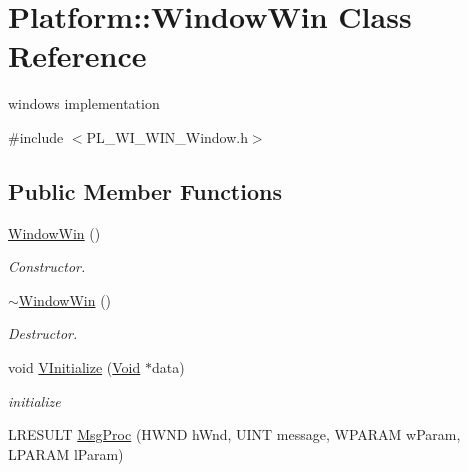 \hypertarget{classPlatform_1_1WindowWin}{
\section{Platform::WindowWin Class Reference}
\label{classPlatform_1_1WindowWin}
}


windows implementation  


{\ttfamily \#include $<$PL\_\-WI\_\-WIN\_\-Window.h$>$}\subsection*{Public Member Functions}
\begin{DoxyCompactItemize}
\item 
\hypertarget{classPlatform_1_1WindowWin_a122958b5cfab59680fcca9b3aacc7f2a}{
\hyperlink{classPlatform_1_1WindowWin_a122958b5cfab59680fcca9b3aacc7f2a}{WindowWin} ()}
\label{classPlatform_1_1WindowWin_a122958b5cfab59680fcca9b3aacc7f2a}

\begin{DoxyCompactList}\small\item\em Constructor. \item\end{DoxyCompactList}\item 
\hypertarget{classPlatform_1_1WindowWin_ac07418285a3a94799509f829b72cc908}{
\hyperlink{classPlatform_1_1WindowWin_ac07418285a3a94799509f829b72cc908}{$\sim$WindowWin} ()}
\label{classPlatform_1_1WindowWin_ac07418285a3a94799509f829b72cc908}

\begin{DoxyCompactList}\small\item\em Destructor. \item\end{DoxyCompactList}\item 
\hypertarget{classPlatform_1_1WindowWin_a1035c00dd6b01cc4cd6f3c0cf3676d44}{
void \hyperlink{classPlatform_1_1WindowWin_a1035c00dd6b01cc4cd6f3c0cf3676d44}{VInitialize} (\hyperlink{structVoid}{Void} $\ast$data)}
\label{classPlatform_1_1WindowWin_a1035c00dd6b01cc4cd6f3c0cf3676d44}

\begin{DoxyCompactList}\small\item\em initialize \item\end{DoxyCompactList}\item 
\hypertarget{classPlatform_1_1WindowWin_ac3d6eb069eceb91045032c90d797d6dd}{
LRESULT \hyperlink{classPlatform_1_1WindowWin_ac3d6eb069eceb91045032c90d797d6dd}{MsgProc} (HWND hWnd, UINT message, WPARAM wParam, LPARAM lParam)}
\label{classPlatform_1_1WindowWin_ac3d6eb069eceb91045032c90d797d6dd}


\end{DoxyCompactItemize}
